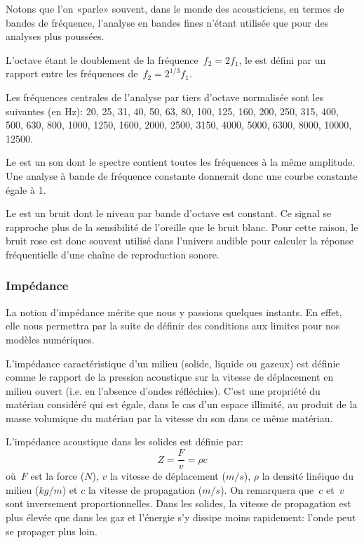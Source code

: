 \medskip
Notons que l'on «parle» souvent, dans le monde des acousticiens, en termes de bandes de fréquence, l'analyse en bandes fines n'étant utilisée que pour des analyses plus poussées.

L'octave étant le doublement de la fréquence~$f_2=2f_1$, le  est défini par un rapport entre les fréquences de~$f_2=2^{1/3}f_1$. 
   
Les fréquences centrales de l'analyse par tiers d'octave normalisée sont les suivantes
(en Hz): 20, 25, 31, 40, 50, 63, 80, 100, 125, 160, 200, 250, 315, 400, 500, 630, 800, 1000, 1250, 1600, 2000, 2500, 3150, 4000, 5000, 6300, 8000, 10000, 12500.

\medskip   
Le   est un son dont le spectre contient toutes les fréquences à la même amplitude. Une analyse à bande de fréquence constante donnerait donc une courbe constante égale à 1.
   
Le  est un bruit dont le niveau par bande d'octave est constant. Ce signal se rapproche plus de la sensibilité de l'oreille que le bruit blanc. Pour cette raison, le bruit rose est donc souvent utilisé dans l'univers audible pour calculer
la réponse fréquentielle d'une chaîne de reproduction sonore.

\medskip
\subsubsection{Impédance}

La notion d'impédance mérite que nous y passions quelques instants. En effet, elle nous permettra par la suite de définir des conditions aux limites pour nos modèles numériques.

L'impédance caractéristique d'un milieu (solide, liquide ou gazeux) est définie comme le rapport de la pression acoustique sur la vitesse de déplacement en milieu ouvert (i.e. en l'absence d'ondes réfléchies). C'est une propriété du matériau considéré qui est égale, dans le cas d'un espace illimité, au produit de la masse volumique du matériau par la vitesse du son dans ce même matériau.

\medskip
L'impédance acoustique dans les solides est définie par:
\begin{equation}
Z = \dfrac{F}{v}=\rho c
\end{equation}
où~$F$ est la force ($N$), $v$ la vitesse de déplacement ($m/s$), $\rho$ la densité linéique du milieu ($kg/m$) et $c$ la vitesse de propagation ($m/s$).
On remarquera que~$c$ et~$v$ sont inversement proportionnelles.
Dans les solides, la vitesse de propagation est plus élevée que dans les gaz et l'énergie s'y dissipe moins rapidement: l'onde peut se propager plus loin.

